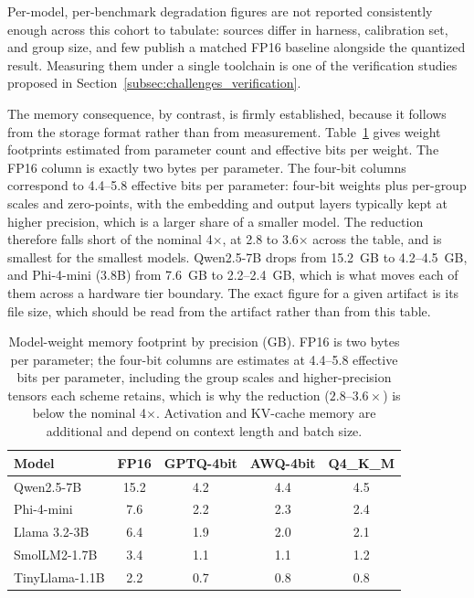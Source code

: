Per-model, per-benchmark degradation figures are not reported consistently
enough across this cohort to tabulate: sources differ in harness, calibration
set, and group size, and few publish a matched FP16 baseline alongside the
quantized result. Measuring them under a single toolchain is one of the
verification studies proposed in
Section~\ref{subsec:challenges_verification}.

The memory consequence, by contrast, is firmly established, because it follows
from the storage format rather than from measurement.
Table~\ref{tab:memory_footprint} gives weight footprints estimated from
parameter count and effective bits per weight. The FP16 column is exactly two
bytes per parameter. The four-bit columns correspond to 4.4--5.8 effective bits
per parameter: four-bit weights plus per-group scales and zero-points, with the
embedding and output layers typically kept at higher precision, which is a
larger share of a smaller model. The reduction therefore falls short of the
nominal 4$\times$, at 2.8 to 3.6$\times$ across the table, and is smallest for
the smallest models. Qwen2.5-7B drops from 15.2~GB to 4.2--4.5~GB, and Phi-4-mini
(3.8B) from 7.6~GB to 2.2--2.4~GB, which is what moves each of them across
a hardware tier boundary. The exact figure for a given artifact is its file
size, which should be read from the artifact rather than from this table.

\begin{table}[ht]
\centering
\caption{Model-weight memory footprint by precision (GB). FP16 is two bytes per parameter; the four-bit columns are estimates at 4.4--5.8 effective bits per parameter, including the group scales and higher-precision tensors each scheme retains, which is why the reduction ($2.8$--$3.6\times$) is below the nominal 4$\times$. Activation and KV-cache memory are additional and depend on context length and batch size.}
\label{tab:memory_footprint}
\footnotesize
\begin{tabular}{lcccc}
\toprule
\textbf{Model} & \textbf{FP16} & \textbf{GPTQ-4bit} & \textbf{AWQ-4bit} & \textbf{Q4\_K\_M} \\
\midrule
Qwen2.5-7B & 15.2 & 4.2 & 4.4 & 4.5 \\
Phi-4-mini & 7.6 & 2.2 & 2.3 & 2.4 \\
Llama 3.2-3B & 6.4 & 1.9 & 2.0 & 2.1 \\
SmolLM2-1.7B & 3.4 & 1.1 & 1.1 & 1.2 \\
TinyLlama-1.1B & 2.2 & 0.7 & 0.8 & 0.8 \\
\bottomrule
\end{tabular}
\end{table}

